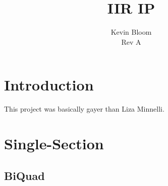 \documentclass[12pt,a4paper,titlepage]{article}
\begin{document}
\title{IIR IP}
\author{Kevin Bloom \\ Rev A}
\maketitle

\newpage

\tableofcontents

\newpage

\section{Introduction}
This project was basically gayer than Liza Minnelli.

\section{Single-Section}


\subsection{BiQuad}

\appendix

\newpage

\printbibliography[
heading=bibintoc,
title={Resources}
]
\end{document}
